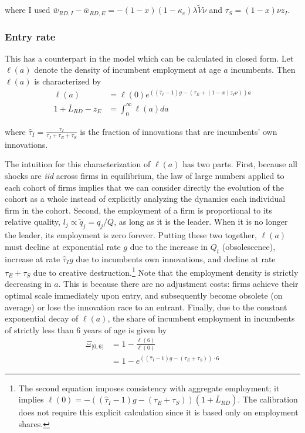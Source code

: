 \documentclass[11pt,english]{article}
\theoremstyle{remark}
\begin{document}
where I used $\overline{w}_{RD,I} - \overline{w}_{RD,E} = -(1-x)(1-\kappa_e) \lambda \tilde{V} \nu$ and $\tau_S = (1-x)\nu z_I$. 

\subsubsection{Entry rate}

This has a counterpart in the model which can be calculated in closed form. Let $\ell(a)$ denote the density of incumbent employment at age $a$ incumbents. Then $\ell(a)$ is characterized by 
\begin{align*}
\ell(a) &= \ell(0)e^{((\hat{\tau}_I -1)g - (\tau_E + (1-x)z_I \nu))a}  \\
1 + \bar{L}_{RD} - z_E &= \int_0^{\infty} \ell(a) da
\end{align*}

where $\hat{\tau}_I = \frac{\tau_I}{\tau_I + \tau_E + \tau_S}$ is the fraction of innovations that are incumbents' own innovations. 

The intuition for this characterization of $\ell(a)$ has two parts. First, because all shocks are \textit{iid} across firms in equilibrium, the law of large numbers applied to each cohort of firms implies that we can consider directly the evolution of the cohort as a whole instead of explicitly analyzing the dynamics each individual firm in the cohort.  Second, the employment of a firm is proportional to its relative quality, $l_j \propto \tilde{q}_j = q_j / Q$, as long as it is the leader. When it is no longer the leader, its employment is zero forever. Putting these two together, $\ell(a)$ must decline at exponential rate $g$ due to the increase in $Q_t$ (obsolescence), increase at rate $\hat{\tau}_I g$ due to incumbents own innovations, and decline at rate $\tau_E + \tau_S$ due to creative destruction.\footnote{The second equation imposes consistency with aggregate employment; it implies $\ell(0) = -((\hat{\tau}_I -1)g - (\tau_E + \tau_S))(1 + \bar{L}_{RD})$. The calibration does not require this explicit calculation since it is based only on employment shares.} Note that the employment density is strictly decreasing in $a$. This is because there are no adjustment costs: firms achieve their optimal scale immediately upon entry, and subsequently become obsolete (on average) or lose the innovation race to an entrant. Finally, due to the constant exponential decay of $\ell(a)$, the share of incumbent employment in incumbents of strictly less than 6 years of age is given by 
\begin{align*}
\Xi_{[0,6)} &=  1 - \frac{\ell(6)}{\ell(0)} \\
&= 1 - e^{((\hat{\tau}_I -1)g - (\tau_E + \tau_S))\cdot 6}
\end{align*}  
\end{document}
